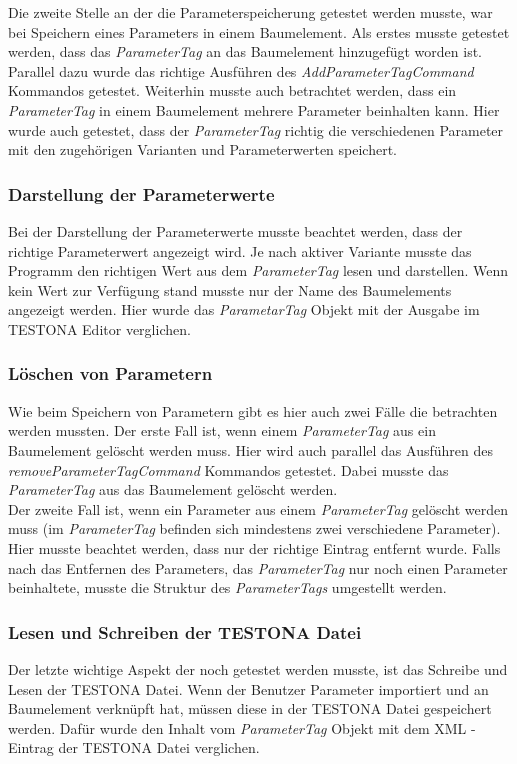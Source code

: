 Die zweite Stelle an der die Parameterspeicherung getestet werden musste, war bei Speichern eines Parameters in einem Baumelement. Als erstes musste getestet werden, dass das \textit{ParameterTag} an das Baumelement hinzugefügt worden ist. Parallel dazu wurde das richtige Ausführen des \textit{AddParameterTagCommand} Kommandos getestet. Weiterhin musste auch betrachtet werden, dass ein \textit{ParameterTag} in einem Baumelement mehrere Parameter beinhalten kann. Hier wurde auch getestet, dass der \textit{ParameterTag} richtig die verschiedenen Parameter mit den zugehörigen Varianten und Parameterwerten speichert.\\



\subsubsection{Darstellung der Parameterwerte}
Bei der Darstellung der Parameterwerte musste beachtet werden, dass der richtige Parameterwert angezeigt wird. Je nach aktiver Variante musste das Programm den richtigen Wert aus dem \textit{ParameterTag} lesen und darstellen. Wenn kein Wert zur Verfügung stand musste nur der Name des Baumelements angezeigt werden. Hier wurde das \textit{ParametarTag} Objekt mit der Ausgabe im TESTONA Editor verglichen.\\


\subsubsection{Löschen von Parametern}
Wie beim Speichern von Parametern gibt es hier auch zwei Fälle die betrachten werden mussten. Der erste Fall ist, wenn einem \textit{ParameterTag} aus ein Baumelement gelöscht werden muss. Hier wird auch parallel das Ausführen des \textit{removeParameterTagCommand} Kommandos getestet. Dabei musste das \textit{ParameterTag} aus das Baumelement gelöscht werden.\\


Der zweite Fall ist, wenn ein Parameter aus einem \textit{ParameterTag} gelöscht werden muss (im \textit{ParameterTag} befinden sich mindestens zwei verschiedene Parameter). Hier musste beachtet werden, dass nur der richtige Eintrag entfernt wurde. Falls nach das Entfernen des Parameters, das \textit{ParameterTag} nur noch einen Parameter beinhaltete, musste die Struktur des \textit{ParameterTags} umgestellt werden.\\


\subsubsection{Lesen und Schreiben der TESTONA Datei}
Der letzte wichtige Aspekt der noch getestet werden musste, ist das Schreibe und Lesen der TESTONA Datei. Wenn der Benutzer Parameter importiert und an Baumelement verknüpft hat, müssen diese in der TESTONA Datei gespeichert werden. Dafür wurde den Inhalt vom \textit{ParameterTag} Objekt mit dem XML - Eintrag der TESTONA Datei verglichen.\\


